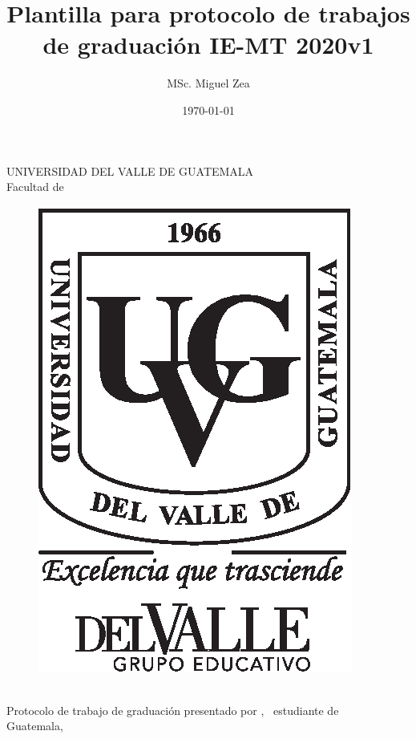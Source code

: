 \documentclass[11pt, letterpaper, twoside, openright]{report}
\title{Plantilla para protocolo de trabajos de graduación IE-MT 2020v1}
\author{MSc. Miguel Zea}
\date{\today}
\begin{document}
\graphicspath{{figuras/}}


\newpage
\cleardoublepage{}
\pagecolor{white}
\color{black}
\setcounter{page}{1}
\thispagestyle{empty}
\begin{center}
	\LARGE UNIVERSIDAD DEL VALLE DE GUATEMALA\\
	\LARGE Facultad de \uvgfacultad \\[0.75cm]
\end{center}
\begin{figure}[h]
	\begin{center}
	\includegraphics[height=5.5 cm]{plantilla/escudoUVGnegro.eps}
	\vspace{0.5in}
	\end{center}
\end{figure}
\begin{center}
	\Large \textbf{\nohyphens{\titulotesis}} \\
	\vfill
	\Large \nohyphens{Protocolo de trabajo de graduación presentado por \nombreestudiante, \ estudiante de \uvgcarrera} \\
	\vfill
	\large Guatemala, \\
	\vspace{1em}
	\anoentrega
\end{center}


\pagestyle{plain}

\newpage
\cleardoublepage
{}
\setcounter{page}{1}
\end{document}
